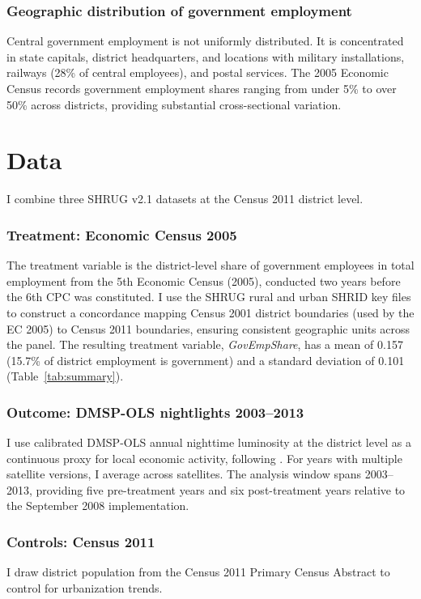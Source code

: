 \documentclass[12pt]{article}
\begin{document}
\subsubsection*{Geographic distribution of government employment} Central government employment is not uniformly distributed. It is concentrated in state capitals, district headquarters, and locations with military installations, railways (28\% of central employees), and postal services. The 2005 Economic Census records government employment shares ranging from under 5\% to over 50\% across districts, providing substantial cross-sectional variation.

\section{Data}
\label{sec:data}

I combine three SHRUG v2.1 \citep{Asher2021} datasets at the Census 2011 district level.

\subsubsection*{Treatment: Economic Census 2005} The treatment variable is the district-level share of government employees in total employment from the 5th Economic Census (2005), conducted two years before the 6th CPC was constituted. I use the SHRUG rural and urban SHRID key files to construct a concordance mapping Census 2001 district boundaries (used by the EC 2005) to Census 2011 boundaries, ensuring consistent geographic units across the panel. The resulting treatment variable, \textit{GovEmpShare}, has a mean of 0.157 (15.7\% of district employment is government) and a standard deviation of 0.101 (Table~\ref{tab:summary}).

\subsubsection*{Outcome: DMSP-OLS nightlights 2003--2013} I use calibrated DMSP-OLS annual nighttime luminosity at the district level as a continuous proxy for local economic activity, following \citet{Henderson2012}. For years with multiple satellite versions, I average across satellites. The analysis window spans 2003--2013, providing five pre-treatment years and six post-treatment years relative to the September 2008 implementation.

\subsubsection*{Controls: Census 2011} I draw district population from the Census 2011 Primary Census Abstract to control for urbanization trends.
\end{document}
